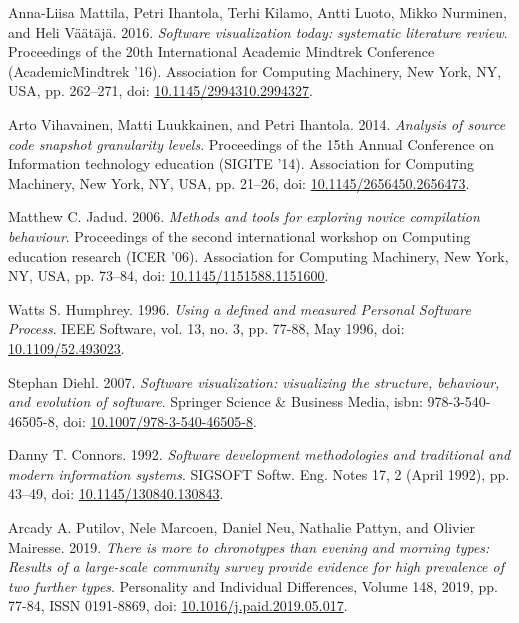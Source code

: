 \begin{thebibliography}{99}
 Anna-Liisa Mattila, Petri Ihantola, Terhi Kilamo, Antti Luoto, Mikko Nurminen, and Heli Väätäjä. 2016. \textit{Software visualization today: systematic literature review}. Proceedings of the 20th International Academic Mindtrek Conference (AcademicMindtrek '16). Association for Computing Machinery, New York, NY, USA, pp. 262–271, doi: \href{https://doi.org/10.1145/2994310.2994327}{10.1145/2994310.2994327}.

 Arto Vihavainen, Matti Luukkainen, and Petri Ihantola. 2014. \textit{Analysis of source code snapshot granularity levels}. Proceedings of the 15th Annual Conference on Information technology education (SIGITE '14). Association for Computing Machinery, New York, NY, USA, pp. 21–26, doi: \href{https://doi.org/10.1145/2656450.2656473}{10.1145/2656450.2656473}.

 Matthew C. Jadud. 2006. \textit{Methods and tools for exploring novice compilation behaviour}. Proceedings of the second international workshop on Computing education research (ICER '06). Association for Computing Machinery, New York, NY, USA, pp. 73–84, doi: \href{https://doi.org/10.1145/1151588.1151600}{10.1145/1151588.1151600}.

 Watts S. Humphrey. 1996. \textit{Using a defined and measured Personal Software Process}. IEEE Software, vol. 13, no. 3, pp. 77-88, May 1996, doi: \href{https://doi.org/10.1109/52.493023}{10.1109/52.493023}.

 Stephan Diehl. 2007. \textit{Software visualization: visualizing the structure, behaviour, and evolution of software}. Springer Science \& Business Media, isbn: 978-3-540-46505-8, doi: \href{https://doi.org/10.1007/978-3-540-46505-8}{10.1007/978-3-540-46505-8}.

 Danny T. Connors. 1992. \textit{Software development methodologies and traditional and modern information systems}. SIGSOFT Softw. Eng. Notes 17, 2 (April 1992), pp. 43–49, doi: \href{https://doi.org/10.1145/130840.130843}{10.1145/130840.130843}.

 Arcady A. Putilov, Nele Marcoen, Daniel Neu, Nathalie Pattyn, and Olivier Mairesse. 2019. \textit{There is more to chronotypes than evening and morning types: Results of a large-scale community survey provide evidence for high prevalence of two further types}. Personality and Individual Differences, Volume 148, 2019, pp. 77-84, ISSN 0191-8869, doi: \href{https://doi.org/10.1016/j.paid.2019.05.017}{10.1016/j.paid.2019.05.017}.


\end{thebibliography}
